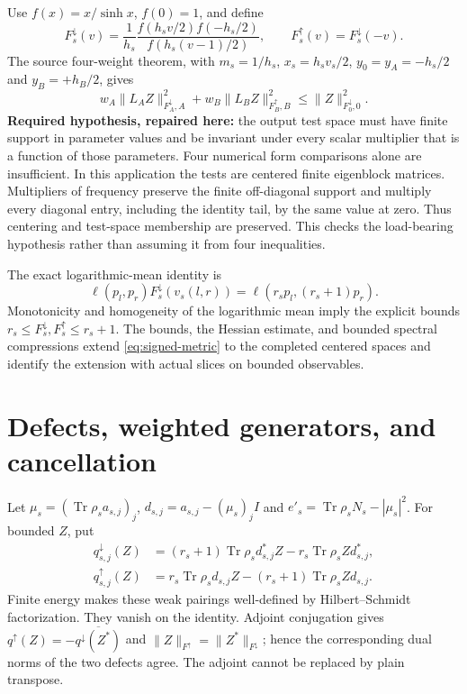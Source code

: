 \documentclass[11pt]{article}
\newcommand{\Tr}{\operatorname{Tr}}
\theoremstyle{remark}\newtheorem{remark}[theorem]{Remark}
\begin{document}
Use $f(x)=x/\sinh x$, $f(0)=1$, and define
\[
 F_s^\downarrow(v)=\frac1{h_s}
 \frac{f(h_sv/2)f(-h_s/2)}{f(h_s(v-1)/2)},\qquad
 F_s^\uparrow(v)=F_s^\downarrow(-v).
\]
The source four-weight theorem, with $m_s=1/h_s$, $x_s=h_sv_s/2$,
$y_0=y_A=-h_s/2$ and $y_B=+h_B/2$, gives
\begin{equation}\label{eq:signed-metric}
 w_A\|L_AZ\|_{F_A^\downarrow,A}^2+
 w_B\|L_BZ\|_{F_B^\uparrow,B}^2
 \le\|Z\|_{F_0^\downarrow,0}^2.
\end{equation}
\textbf{Required hypothesis, repaired here:} the output test space must
have finite support in parameter values and be invariant under every
scalar multiplier that is a function of those parameters. Four numerical
form comparisons alone are insufficient. In this application the tests
are centered finite eigenblock matrices. Multipliers of frequency
preserve the finite off-diagonal support and multiply every diagonal
entry, including the identity tail, by the same value at zero. Thus
centering and test-space membership are preserved. This checks the
load-bearing hypothesis rather than assuming it from four inequalities.

The exact logarithmic-mean identity is
\[
 \ell(p_l,p_r)F_s^\downarrow(v_s(l,r))
 =\ell(r_sp_l,(r_s+1)p_r).
\]
Monotonicity and homogeneity of the logarithmic mean imply the explicit
bounds $r_s\le F_s^\downarrow,F_s^\uparrow\le r_s+1$.
The bounds, the Hessian estimate, and bounded spectral compressions extend
\eqref{eq:signed-metric} to the completed centered spaces and identify
the extension with actual slices on bounded observables.

\section{Defects, weighted generators, and cancellation}
Let $\mu_s=(\Tr\rho_s a_{s,j})_j$, $d_{s,j}=a_{s,j}-(\mu_s)_jI$ and
$e'_s=\Tr\rho_sN_s-|\mu_s|^2$. For bounded $Z$, put
\begin{align*}
 q_{s,j}^\downarrow(Z)&=(r_s+1)\Tr\rho_s d_{s,j}^*Z-r_s\Tr\rho_s Z d_{s,j}^*,\\
 q_{s,j}^\uparrow(Z)&=r_s\Tr\rho_s d_{s,j}Z-(r_s+1)\Tr\rho_s Z d_{s,j}.
\end{align*}
Finite energy makes these weak pairings well-defined by Hilbert--Schmidt
factorization. They vanish on the identity. Adjoint conjugation gives
$q^\uparrow(Z)=-\overline{q^\downarrow(Z^*)}$ and
$\|Z\|_{F^\uparrow}=\|Z^*\|_{F^\downarrow}$; hence the corresponding
dual norms of the two defects agree. The adjoint cannot be replaced by
plain transpose.
\end{document}
